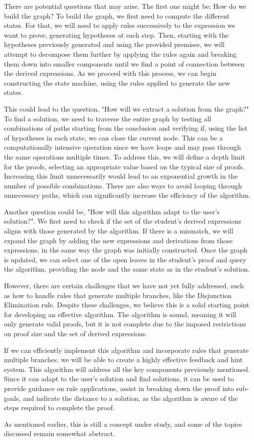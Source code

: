There are potential questions that may arise. The first one might be: How do we build the graph? To build the graph, we first need to compute the different states. For that, we will need to apply rules successively to the expression we want to prove, generating hypotheses at each step. Then, starting with the hypotheses previously generated and using the provided premises, we will attempt to decompose them further by applying the rules again and breaking them down into smaller components until we find a point of connection between the derived expressions. As we proceed with this process, we can begin constructing the state machine, using the rules applied to generate the new states.

This could lead to the question, "How will we extract a solution from the graph?" To find a solution, we need to traverse the entire graph by testing all combinations of paths starting from the conclusion and verifying if, using the list of hypotheses in each state, we can close the current node. This can be a computationally intensive operation since we have loops and may pass through the same operations multiple times. To address this, we will define a depth limit for the proofs, selecting an appropriate value based on the typical size of proofs. Increasing this limit unnecessarily would lead to an exponential growth in the number of possible combinations. There are also ways to avoid looping through unnecessary paths, which can significantly increase the efficiency of the algorithm.

Another question could be, "How will this algorithm adapt to the user's solution?". We first need to check if the set of the student's derived expressions aligns with those generated by the algorithm. If there is a mismatch, we will expand the graph by adding the new expressions and derivations from those expressions, in the same way the graph was initially constructed. Once the graph is updated, we can select one of the open leaves in the student's proof and query the algorithm, providing the node and the same state as in the student's solution.

However, there are certain challenges that we have not yet fully addressed, such as how to handle rules that generate multiple branches, like the Disjunction Elimination rule. Despite these challenges, we believe this is a solid starting point for developing an effective algorithm. The algorithm is sound, meaning it will only generate valid proofs, but it is not complete due to the imposed restrictions on proof size and the set of derived expressions.

If we can efficiently implement this algorithm and incorporate rules that generate multiple branches, we will be able to create a highly effective feedback and hint system. This algorithm will address all the key components previously mentioned. Since it can adapt to the user's solution and find solutions, it can be used to provide guidance on rule applications, assist in breaking down the proof into sub-goals, and indicate the distance to a solution, as the algorithm is aware of the steps required to complete the proof.

As mentioned earlier, this is still a concept under study, and some of the topics discussed remain somewhat abstract.